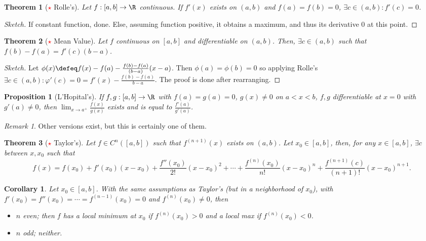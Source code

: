 \documentclass[12pt, oneside]{article}
\newcommand*{\important}{\textcolor{red}{$\star$} }
\theoremstyle{definition}
\theoremstyle{plain}
\newtheorem{thm}{Theorem}
\newtheorem{cor}{Corollary}
\newtheorem{prop}{Proposition}
\theoremstyle{remark}
\newtheorem{remark}{Remark}
\begin{document}
\begin{thm}[\important Rolle's]
  Let $f : [a, b] \to \R$ continuous. If $f'(x)$ exists on $(a, b)$ and $f(a) = f(b) = 0$, $\exists c \in (a, b) : f'(c) = 0$.
\end{thm}
  
\begin{proof}[Sketch]
  If constant function, done. Else, assuming function positive, it obtains a maximum, and thus its derivative 0 at this point.
\end{proof}

\begin{thm}[\textcolor{red}{$\star$} Mean Value]
  Let $f$ continuous on $[a, b]$ and differentiable on $(a, b)$. Then, $\exists c \in (a, b)$ such that $f(b) - f(a) = f'(c) (b - a)$.
\end{thm}
\begin{proof}[Sketch]
  Let $\phi(x) \defeq f(x) - f(a) - \frac{f(b) - f(a)}{(b-a)}(x-a)$. Then $\phi(a) = \phi(b) = 0$ so applying Rolle's $\exists c \in (a, b) : \varphi'(c) = 0 = f'(x) - \frac{f(b) - f(a)}{b-a}$. The proof is done after rearranging.
\end{proof}

\begin{prop}[L'Hopital's]
  If $f, g : [a, b] \to \R$ with $f(a) = g(a) = 0$, $g(x)\neq 0$ on $a < x < b$, $f, g$ differentiable at $x = 0$ with $g'(a) \neq 0$, then $\lim_{x \to a^+} \frac{f(x)}{g(x)}$ exists and is equal to $\frac{f'(a)}{g'(a)}$.
\end{prop}
\begin{remark}
  Other versions exist, but this is certainly one of them.
\end{remark}

\begin{thm}[\textcolor{red}{$\star$} Taylor's]
  Let $f \in C^{n}([a, b])$ such that $f^{(n+1)}(x)$ exists on $(a, b)$. Let $x_0 \in [a, b]$, then, for any $x \in [a, b]$, $\exists c $ between $x, x_0$ such that \[
  f(x) = f(x_0) + f'(x_0)(x - x_0) + \frac{f''(x_0)}{2!}(x-x_0)^2 + \cdots + \frac{f^{(n)}(x_0)}{n!}(x-x_0)^n + \frac{f^{(n+1)}(c)}{(n+1)!}(x-x_0)^{n+1}.
  \]
\end{thm}

\begin{cor}
  Let $x_0 \in [a, b]$. With the same assumptions as Taylor's (but in a neighborhood of $x_0$), with $f'(x_0) = f''(x_0) = \cdots = f^{(n-1)}(x_0) = 0$ and $f^{(n)}(x_0) \neq 0$, then \begin{itemize}
    \item $n$ even; then $f$ has a local minimum at $x_0$ if $f^{(n)}(x_0) > 0$ and a local max if $f^{(n)}(x_0) < 0$.
    \item $n$ odd; neither. 
  \end{itemize}
\end{cor}
\end{document}
